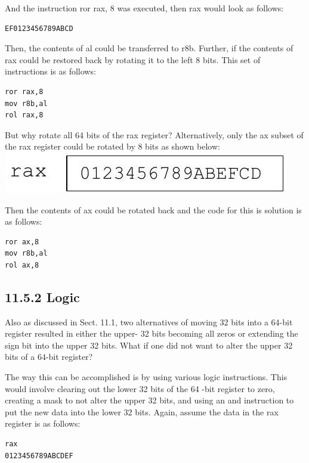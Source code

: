 \documentclass[10pt]{article}
\begin{document}
And the instruction ror rax, 8 was executed, then rax would look as follows:

\begin{verbatim}
EF0123456789ABCD
\end{verbatim}

Then, the contents of al could be transferred to r8b. Further, if the contents of rax could be restored back by rotating it to the left 8 bits. This set of instructions is as follows:

\begin{verbatim}
ror rax,8
mov r8b,al
rol rax,8
\end{verbatim}

But why rotate all 64 bits of the rax register? Alternatively, only the ax subset of the rax register could be rotated by 8 bits as shown below:\\
\includegraphics[max width=\textwidth, center]{2025_03_24_ebe50cc223a6fbc49eecg-259(1)}

Then the contents of ax could be rotated back and the code for this is solution is as follows:

\begin{verbatim}
ror ax,8
mov r8b,al
rol ax,8
\end{verbatim}

\subsection*{11.5.2 Logic}
Also as discussed in Sect. 11.1, two alternatives of moving 32 bits into a 64-bit register resulted in either the upper- 32 bits becoming all zeros or extending the sign bit into the upper 32 bits. What if one did not want to alter the upper 32 bits of a 64-bit register?

The way this can be accomplished is by using various logic instructions. This would involve clearing out the lower 32 bits of the 64 -bit register to zero, creating a mask to not alter the upper 32 bits, and using an and instruction to put the new data into the lower 32 bits. Again, assume the data in the rax register is as follows:

\begin{verbatim}
rax
0123456789ABCDEF
\end{verbatim}
\end{document}
